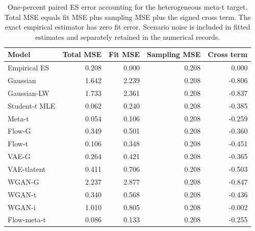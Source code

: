 \documentclass[11pt]{article}
\theoremstyle{definition}\newtheorem{definition}[theorem]{Definition}
\theoremstyle{remark}\newtheorem{remark}[theorem]{Remark}
\begin{document}
\begin{table}[htbp]
\centering\footnotesize
\setlength{\tabcolsep}{4pt}
\begin{tabular}{lrrrr}
\toprule
Model & Total MSE & Fit MSE & Sampling MSE & Cross term \\
\midrule
Empirical ES & 0.208 & 0.000 & 0.208 & 0.000 \\
Gaussian & 1.642 & 2.239 & 0.208 & -0.806 \\
Gaussian-LW & 1.733 & 2.361 & 0.208 & -0.837 \\
Student-$t$ MLE & 0.062 & 0.240 & 0.208 & -0.385 \\
Meta-t & 0.054 & 0.106 & 0.208 & -0.259 \\
Flow-G & 0.349 & 0.501 & 0.208 & -0.360 \\
Flow-t & 0.106 & 0.348 & 0.208 & -0.451 \\
VAE-G & 0.264 & 0.421 & 0.208 & -0.365 \\
VAE-tlatent & 0.411 & 0.706 & 0.208 & -0.503 \\
WGAN-G & 2.237 & 2.877 & 0.208 & -0.847 \\
WGAN-t & 0.340 & 0.568 & 0.208 & -0.436 \\
WGAN-i & 1.010 & 0.805 & 0.208 & -0.002 \\
Flow-meta-t & 0.086 & 0.133 & 0.208 & -0.255 \\
\bottomrule
\end{tabular}
\caption{One-percent paired ES error accounting for the heterogeneous meta-t target. Total MSE equals fit MSE plus sampling MSE plus the signed cross term. The exact empirical estimator has zero fit error. Scenario noise is included in fitted estimates and separately retained in the numerical records.}\label{tab:r4-decomp-metat}
\end{table}
\end{document}
